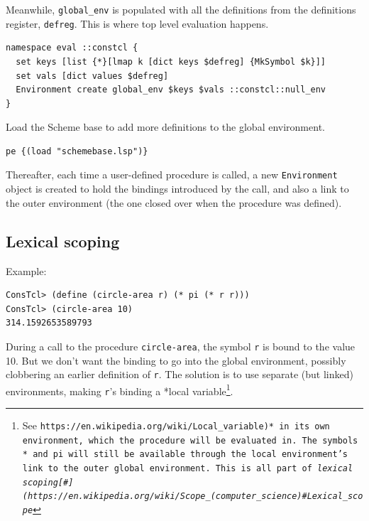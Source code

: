 \documentclass[twoside,9pt]{report}
\begin{document}
Meanwhile, \texttt{global\_env} is populated with all the definitions from the definitions register, \texttt{defreg}. This is where top level evaluation happens.

\noindent\makebox[\linewidth]{\rule{\linewidth}{0.4pt}}
\begin{lstlisting}
namespace eval ::constcl {
  set keys [list {*}[lmap k [dict keys $defreg] {MkSymbol $k}]]
  set vals [dict values $defreg]
  Environment create global_env $keys $vals ::constcl::null_env
}
\end{lstlisting}
\noindent\makebox[\linewidth]{\rule{\linewidth}{0.4pt}}

Load the Scheme base to add more definitions to the global environment.

\noindent\makebox[\linewidth]{\rule{\linewidth}{0.4pt}}
\begin{lstlisting}
pe {(load "schemebase.lsp")}
\end{lstlisting}
\noindent\makebox[\linewidth]{\rule{\linewidth}{0.4pt}}

Thereafter, each time a user-defined procedure is called, a new \texttt{Environment} object is created to hold the bindings introduced by the call, and also a link to the outer environment (the one closed over when the procedure was defined).

\subsection{Lexical scoping}
\label{lexical-scoping}

Example:

\noindent\makebox[\linewidth]{\rule{\linewidth}{0.4pt}}
\begin{lstlisting}
ConsTcl> (define (circle-area r) (* pi (* r r)))
ConsTcl> (circle-area 10)
314.1592653589793
\end{lstlisting}
\noindent\makebox[\linewidth]{\rule{\linewidth}{0.4pt}}

During a call to the procedure \texttt{circle-area}, the symbol \texttt{r} is bound to the value 10. But we don't want the binding to go into the global environment, possibly clobbering an earlier definition of \texttt{r}. The solution is to use separate (but linked) environments, making \texttt{r}'s binding a *local variable\footnote{See \texttt{https://en.wikipedia.org/wiki/Local\_variable)* in its own environment, which the procedure will be evaluated in. The symbols \texttt{*} and \texttt{pi} will still be available through the local environment's link to the outer global environment. This is all part of \emph{lexical scoping[\#](https://en.wikipedia.org/wiki/Scope\_(computer\_science)\#Lexical\_scope}}}.
\end{document}
